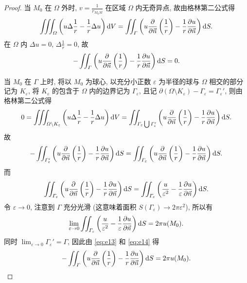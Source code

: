\begin{proof}
  当 $M_0$ 在 $\varOmega$ 外时, $v=\frac{1}{r_{M_0M}}$ 在区域 $\varOmega$ 内无奇异点, 故由格林第二公式得
  \[\iiint_{\varOmega} \left(u\Delta\frac{1}{r}-\frac{1}{r}\Delta u\right)\mathop{}\!\mathrm{d} V
    = \iint_{\varGamma}\left(u\frac{\partial}{\partial\vec{n}}\left(\frac{1}{r}\right)
      - \frac{1}{r}\frac{\partial u}{\partial\vec{n}}\right) \mathop{}\!\mathrm{d} S.\]
  在 $\varOmega$ 内 $\Delta u=0$, $\Delta\frac{1}{r}=0$, 故
  \[-\iint_{\varGamma}\left(u\frac{\partial}{\partial\vec{n}}\left(\frac{1}{r}\right)
    - \frac{1}{r}\frac{\partial u}{\partial\vec{n}}\right)\mathop{}\!\mathrm{d} S = 0.\]

  当 $M_0$ 在 $\varGamma$ 上时, 将以 $M_0$ 为球心, 
  以充分小正数 $\varepsilon$ 为半径的球与 $\varOmega$ 相交的部分记为 $K_{\varepsilon}$,
  将 $K_{\varepsilon}$ 的包含于 $\varOmega$ 内的边界记为 $\varGamma_{\varepsilon}$,
  且记 $\partial(\varOmega\setminus K_{\varepsilon})-\varGamma_{\varepsilon}=\varGamma_{\varepsilon}'$,
  则由格林第二公式得
  \[0 = \iiint_{\varOmega\backslash K_{\varepsilon}}
    \left(u\Delta\frac{1}{r} - \frac{1}{r}\Delta u\right)\mathop{}\!\mathrm{d} V
    = \iint_{\varGamma_{\varepsilon}\bigcup\varGamma_{\varepsilon}'} \left(u\frac{\partial}{\partial\vec{n}}
      \left(\frac{1}{r}\right)-\frac{1}{r}\frac{\partial u}{\partial\vec{n}}\right) \mathop{}\!\mathrm{d} S.\]
  故
  \begin{equation}\label{eq:e13}
    -\iint_{\varGamma_{\varepsilon}'} \left(u\frac{\partial}{\partial\vec{n}}\left(\frac{1}{r}\right)
    -\frac{1}{r}\frac{\partial u}{\partial\vec{n}}\right) \mathop{}\!\mathrm{d} S
    = \iint_{\varGamma_{\varepsilon}}\left(u\frac{\partial}{\partial\vec{n}}
      \left(\frac{1}{r}\right) - \frac{1}{r}\frac{\partial u}{\partial\vec{n}}\right)\mathop{}\!\mathrm{d} S.
  \end{equation}
  而
  \[\iint_{\varGamma_{\varepsilon}} \left(u\frac{\partial}{\partial\vec{n}}\left(\frac{1}{r}\right)
    -\frac{1}{r}\frac{\partial u}{\partial\vec{n}}\right) \mathop{}\!\mathrm{d} S
    = \iint_{\varGamma_{\varepsilon}}\left(\frac{u}{\varepsilon^2}
      - \frac{1}{\varepsilon}\frac{\partial u}{\partial\vec{n}}\right) \mathop{}\!\mathrm{d} S.\]
  令 $\varepsilon\to 0$, 注意到 $\varGamma$ 充分光滑
  (这意味着面积 $S(\varGamma_{\varepsilon})\to 2\pi\varepsilon^2$), 所以有
  \begin{equation}\label{eq:e14}
    \lim_{\varepsilon\to 0} \iint_{\varGamma_{\varepsilon}}
    \left(\frac{u}{\varepsilon^2}-\frac{1}{\varepsilon}\frac{\partial u}{\partial\vec{n}}\right)\mathop{}\!\mathrm{d} S
    = 2\pi u(M_0).
  \end{equation}
  同时 $\lim_{\varepsilon\to0}\varGamma_{\varepsilon}'=\varGamma$,
  因此由 \eqref{eq:e13} 和 \eqref{eq:e14} 得
  \[-\iint_{\varGamma} \left(u\frac{\partial}{\partial\vec{n}}\left(\frac{1}{r}\right)-\frac{1}{r}
    \frac{\partial u}{\partial\vec{n}}\right)\mathop{}\!\mathrm{d} S = 2\pi u(M_0). \qedhere\]
\end{proof}


